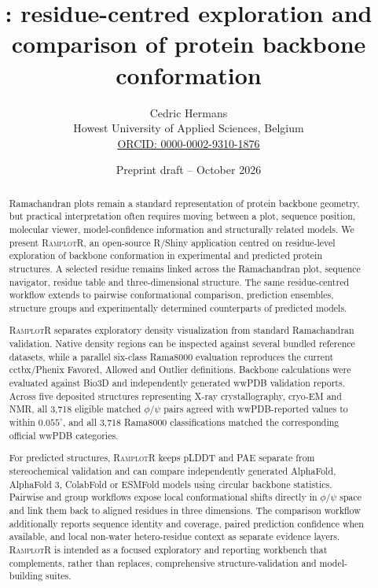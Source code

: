 \documentclass[11pt]{article}
\title{\ramplotr: residue-centred exploration and comparison of protein backbone conformation}
\author{Cedric Hermans\\
Howest University of Applied Sciences, Belgium\\
\href{https://orcid.org/0000-0002-9310-1876}{ORCID: 0000-0002-9310-1876}}
\date{Preprint draft -- October 2026}
\newcommand{\ramplotr}{\textsc{RamplotR}\xspace}
\newcommand{\degree}{^\circ}
\begin{document}
\maketitle

\begin{abstract}
Ramachandran plots remain a standard representation of protein backbone geometry, but practical interpretation often requires moving between a plot, sequence position, molecular viewer, model-confidence information and structurally related models. We present \ramplotr, an open-source R/Shiny application centred on residue-level exploration of backbone conformation in experimental and predicted protein structures. A selected residue remains linked across the Ramachandran plot, sequence navigator, residue table and three-dimensional structure. The same residue-centred workflow extends to pairwise conformational comparison, prediction ensembles, structure groups and experimentally determined counterparts of predicted models.

\ramplotr separates exploratory density visualization from standard Ramachandran validation. Native density regions can be inspected against several bundled reference datasets, while a parallel six-class Rama8000 evaluation reproduces the current cctbx/Phenix Favored, Allowed and Outlier definitions. Backbone calculations were evaluated against Bio3D and independently generated wwPDB validation reports. Across five deposited structures representing X-ray crystallography, cryo-EM and NMR, all 3,718 eligible matched $\phi/\psi$ pairs agreed with wwPDB-reported values to within $0.055\degree$, and all 3,718 Rama8000 classifications matched the corresponding official wwPDB categories.

For predicted structures, \ramplotr keeps pLDDT and PAE separate from stereochemical validation and can compare independently generated AlphaFold, AlphaFold 3, ColabFold or ESMFold models using circular backbone statistics. Pairwise and group workflows expose local conformational shifts directly in $\phi/\psi$ space and link them back to aligned residues in three dimensions. The comparison workflow additionally reports sequence identity and coverage, paired prediction confidence when available, and local non-water hetero-residue context as separate evidence layers. \ramplotr is intended as a focused exploratory and reporting workbench that complements, rather than replaces, comprehensive structure-validation and model-building suites.
\end{abstract}
\end{document}
